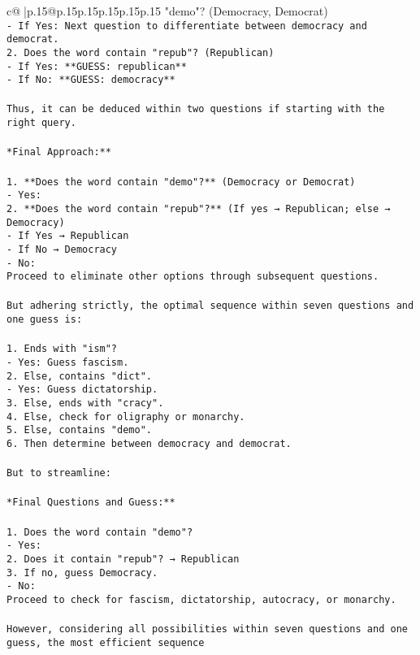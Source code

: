 \documentclass{article}
\begin{document}
{\begin{supertabular}{c@{$\;$}|p{.15\linewidth}@{}p{.15\linewidth}p{.15\linewidth}p{.15\linewidth}p{.15\linewidth}p{.15\linewidth}}
{{{"demo"? (Democracy, Democrat)\\ \tt    - If Yes: Next question to differentiate between democracy and democrat.\\ \tt 2. Does the word contain "repub"? (Republican)\\ \tt    - If Yes: **GUESS: republican**\\ \tt    - If No: **GUESS: democracy**\\ \tt \\ \tt Thus, it can be deduced within two questions if starting with the right query.\\ \tt \\ \tt **Final Approach:**\\ \tt \\ \tt 1. **Does the word contain "demo"?** (Democracy or Democrat)\\ \tt    - Yes:\\ \tt      2. **Does the word contain "repub"?** (If yes → Republican; else → Democracy)\\ \tt        - If Yes → Republican\\ \tt        - If No → Democracy\\ \tt    - No:\\ \tt      Proceed to eliminate other options through subsequent questions.\\ \tt \\ \tt But adhering strictly, the optimal sequence within seven questions and one guess is:\\ \tt \\ \tt 1. Ends with "ism"?\\ \tt    - Yes: Guess fascism.\\ \tt 2. Else, contains "dict".\\ \tt    - Yes: Guess dictatorship.\\ \tt 3. Else, ends with "cracy".\\ \tt 4. Else, check for oligraphy or monarchy.\\ \tt 5. Else, contains "demo".\\ \tt 6. Then determine between democracy and democrat.\\ \tt \\ \tt But to streamline:\\ \tt \\ \tt **Final Questions and Guess:**\\ \tt \\ \tt 1. Does the word contain "demo"?\\ \tt    - Yes:\\ \tt      2. Does it contain "repub"? → Republican\\ \tt      3. If no, guess Democracy.\\ \tt    - No:\\ \tt      Proceed to check for fascism, dictatorship, autocracy, or monarchy.\\ \tt \\ \tt However, considering all possibilities within seven questions and one guess, the most efficient sequence }}}
\end{supertabular}}
\end{document}
